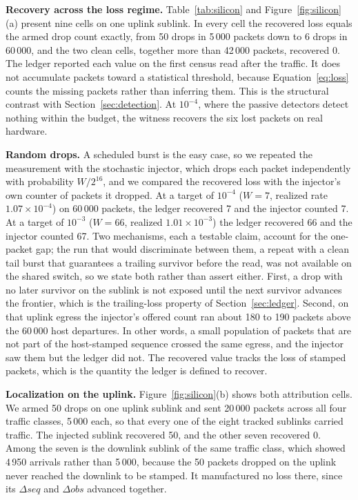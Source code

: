 \textbf{Recovery across the loss regime.} Table~\ref{tab:silicon} and Figure~\ref{fig:silicon}(a) present nine cells on one uplink sublink. In every cell the recovered loss equals the armed drop count exactly, from 50 drops in 5\,000 packets down to 6 drops in 60\,000, and the two clean cells, together more than 42\,000 packets, recovered 0. The ledger reported each value on the first census read after the traffic. It does not accumulate packets toward a statistical threshold, because Equation~\eqref{eq:loss} counts the missing packets rather than inferring them. This is the structural contrast with Section~\ref{sec:detection}. At $10^{-4}$, where the passive detectors detect nothing within the budget, the witness recovers the six lost packets on real hardware.

\textbf{Random drops.} A scheduled burst is the easy case, so we repeated the measurement with the stochastic injector, which drops each packet independently with probability $W/2^{16}$, and we compared the recovered loss with the injector's own counter of packets it dropped. At a target of $10^{-4}$ ($W=7$, realized rate $1.07\times10^{-4}$) on 60\,000 packets, the ledger recovered 7 and the injector counted 7. At a target of $10^{-3}$ ($W=66$, realized $1.01\times10^{-3}$) the ledger recovered 66 and the injector counted 67. Two mechanisms, each a testable claim, account for the one-packet gap; the run that would discriminate between them, a repeat with a clean tail burst that guarantees a trailing survivor before the read, was not available on the shared switch, so we state both rather than assert either. First, a drop with no later survivor on the sublink is not exposed until the next survivor advances the frontier, which is the trailing-loss property of Section~\ref{sec:ledger}. Second, on that uplink egress the injector's offered count ran about 180 to 190 packets above the 60\,000 host departures. In other words, a small population of packets that are not part of the host-stamped sequence crossed the same egress, and the injector saw them but the ledger did not. The recovered value tracks the loss of stamped packets, which is the quantity the ledger is defined to recover.

\textbf{Localization on the uplink.} Figure~\ref{fig:silicon}(b) shows both attribution cells. We armed 50 drops on one uplink sublink and sent 20\,000 packets across all four traffic classes, 5\,000 each, so that every one of the eight tracked sublinks carried traffic. The injected sublink recovered 50, and the other seven recovered 0. Among the seven is the downlink sublink of the same traffic class, which showed 4\,950 arrivals rather than 5\,000, because the 50 packets dropped on the uplink never reached the downlink to be stamped. It manufactured no loss there, since its $\Delta\mathit{seq}$ and $\Delta\mathit{obs}$ advanced together.

